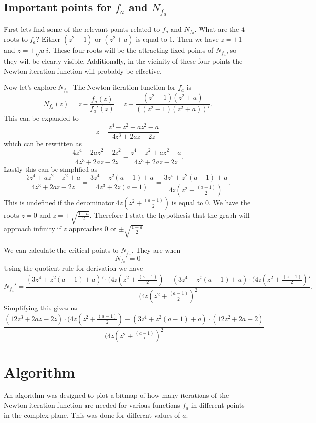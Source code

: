 

%
\subsection{Important points for $f_a$ and $N_{f_a}$}
First lets find some of the relevant points related to $f_a$ and $N_{f_a}$. What are the 4 roots to $f_a$? Either $(z^2-1)$ or $(z^2+a)$ is equal to $0$. Then we have $z=\pm1$ and $z=\pm\sqrt{a}i$. These four roots will be the attracting fixed points of $N_{f_a}$, so they will be clearly visible. Additionally, in the vicinity of these four points the Newton iteration function will probably be effective.

Now let's explore $N_{f_a}$- The Newton iteration function for $f_a$ is 
\[N_{f_{a}}(z)=z-\frac{f_a(z)}{f_a'(z)}=z-\frac{(z^2-1)(z^2+a)}{((z^2-1)(z^2+a))'}.\]
This can be expanded to
\[z-\frac{z^4-z^2+az^2-a}{4z^3+2az-2z}\]
which can be rewritten as
\[\frac{4z^4+2az^2-2z^2}{4z^3+2az-2z}-\frac{z^4-z^2+az^2-a}{4z^3+2az-2z}.\]
Lastly this can be simplified as
\[\frac{3z^4+az^2-z^2+a}{4z^3+2az-2z}=\frac{3z^4+z^2(a-1)+a}{4z^3+2z(a-1)}=\frac{3z^4+z^2(a-1)+a}{4z(z^2+\frac{(a-1)}{2})}.\]
This is undefined if the denominator $4z(z^2+\frac{(a-1)}{2})$ is equal to $0$. We have the roots $z=0$ and $z=\pm\sqrt{\frac{1-a}{2}}$. Therefore I state the hypothesis that the graph will approach infinity if $z$ approaches $0$ or $\pm\sqrt{\frac{1-a}{2}}$. 

We can calculate the critical points to $N_{f_a}$. They are when  
\[N_{f_a}'=0\]
Using the quotient rule for derivation we have
\[N_{f_a}'=\frac{(3z^4+z^2(a-1)+a)'\cdot(4z(z^2+\frac{(a-1)}{2})-(3z^4+z^2(a-1)+a)\cdot(4z(z^2+\frac{(a-1)}{2})'}{(4z(z^2+\frac{(a-1)}{2})^{2}}.\]
Simplifying this gives us
\[\frac{(12z^3+2az-2z)\cdot(4z(z^2+\frac{(a-1)}{2})-(3z^4+z^2(a-1)+a)\cdot(12z^2+2a-2)}{(4z(z^2+\frac{(a-1)}{2})^{2}}\]

%
\newpage
\section{Algorithm}
An algorithm was designed to plot a bitmap of how many iterations of the Newton iteration function are needed for various functions $f_a$ in different points in the complex plane. This was done for different values of $a$.
%
\newpage
